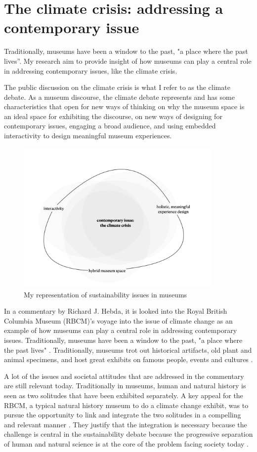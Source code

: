 \section{The climate crisis: addressing a contemporary issue}

Traditionally, museums have been a window to the past, "a place where the past lives”. My research aim to provide insight of how museums can play a central role in addressing contemporary issues, like the climate crisis.

The public discussion on the climate crisis is what I refer to as the climate debate. As a museum discourse, the climate debate represents and has some characteristics that open for new ways of thinking on why the museum space is an ideal space for exhibiting the discourse, on new ways of designing for contemporary issues, engaging a broad audience, and using embedded interactivity to design meaningful museum experiences.

\begin{figure}[h]
\includegraphics[width=10cm]{pictures/problem_sphere.png}
\caption{My representation of sustainability issues in museums}
\centering
\end{figure}

In a commentary by Richard J. Hebda, it is looked into the Royal British Columbia Museum (RBCM)’s voyage into the issue of climate change as an example of how museums can play a central role in addressing contemporary issues. Traditionally, museums have been a window to the past, "a place where the past lives" \autocite[p. 1]{hebda_article}.  Traditionally, museums trot out historical artifacts, old plant and animal specimens, and host great exhibits on famous people, events and cultures \autocite[p.1]{hebda_article}.
\par
A lot of the issues and societal attitudes that are addressed in the commentary are still relevant today. Traditionally in museums, human and natural history is seen as two solitudes that have been exhibited separately. A key appeal for the RBCM, a typical natural history museum to do a climate change exhibit, was to pursue the opportunity to link and integrate the two solitudes in a compelling and relevant manner \autocite[p. 2]{hebda_article}. They justify that the integration is necessary because the challenge is central in the sustainability debate because the progressive separation of human and natural science is at the core of the problem facing society today \autocite[p.2]{hebda_article}.

